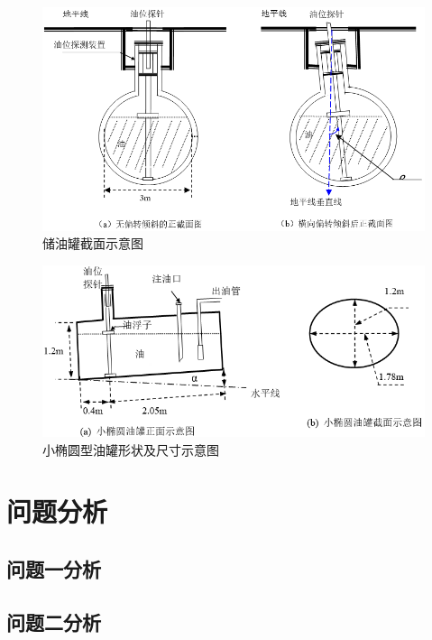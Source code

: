 \documentclass{cumcmthesis}
\begin{document}
\begin{figure}[H]
\begin{center}
\includegraphics[scale=0.6]{figure3.png}
\caption{储油罐截面示意图}
\end{center}
\end{figure}

\begin{figure}[H]
\begin{center}
\includegraphics[scale=0.6]{figure4.png}
\caption{小椭圆型油罐形状及尺寸示意图}
\end{center}
\end{figure}

\section{问题分析}

\subsection{问题一分析}


\subsection{问题二分析}
\end{document}
